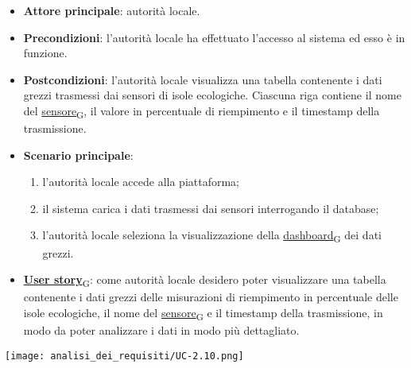 \newpage
{}
\begin{itemize}
	\item \textbf{Attore principale}: autorità locale.
	\item \textbf{Precondizioni}: l'autorità locale ha effettuato l'accesso al sistema ed esso è in funzione.
	\item \textbf{Postcondizioni}: l'autorità locale visualizza una tabella contenente i dati grezzi trasmessi dai sensori di isole ecologiche.
	      Ciascuna riga contiene il nome del \href{https://7last.github.io/docs/pb/documentazione-interna/glossario\#sensore}{sensore\textsubscript{G}}, il valore in percentuale di riempimento e il timestamp della trasmissione.
	\item \textbf{Scenario principale}:
	      \begin{enumerate}
		      \item l'autorità locale accede alla piattaforma;
		      \item il sistema carica i dati trasmessi dai sensori interrogando il database;
		      \item l'autorità locale seleziona la visualizzazione della \href{https://7last.github.io/docs/pb/documentazione-interna/glossario\#dashboard}{dashboard\textsubscript{G}} dei dati grezzi.
	      \end{enumerate}
	\item \href{https://7last.github.io/docs/pb/documentazione-interna/glossario\#user-story}{\textbf{User story}\textsubscript{G}}:
	      come autorità locale desidero poter visualizzare una tabella contenente i dati grezzi delle misurazioni di riempimento in percentuale delle isole ecologiche,
	      il nome del \href{https://7last.github.io/docs/pb/documentazione-interna/glossario\#sensore}{sensore\textsubscript{G}} e il timestamp della trasmissione, in modo da poter analizzare i dati in modo più dettagliato.
\end{itemize}
\begin{center}
	\texttt{[image: analisi\_dei\_requisiti/UC-2.10.png]}
\end{center}

